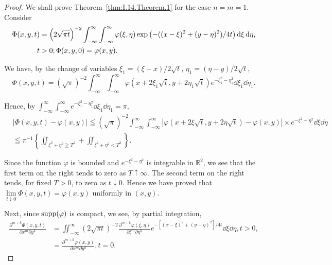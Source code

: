 \begin{proof}
 We shall prove Theorem~\ref{thm:I.14.Theorem.1} for the case $n = m = 1$. Consider 
\begin{align}
\Phi (x, y, t)& = \left(2 \sqrt {\pi t}\right) ^{-2} \int_{- \infty} ^{\infty} \int_{- \infty} ^{\infty} \varphi (\xi , \eta) \exp\left(- ((x- \xi) ^{2} + (y- \eta) ^{2}) / 4 t\right) \mathop{}\!\mathrm{d} \xi \mathop{}\!\mathrm{d} \eta , \notag \\
t& > 0; \Phi (x, y, 0) = \varphi (x, y).  \label{eq:I.14.2}
\end{align}

We have, by the change of variables $\xi_{1} = (\xi- x)/2\sqrt{t}$, $\eta_{1} = (\eta- y)/2\sqrt{t}$, 
\[
\Phi (x, y, t) = (\sqrt {\pi}) ^{-2} \int_{- \infty} ^{\infty} \int_{- \infty} ^{\infty} \varphi (x + 2 \xi_{1} \sqrt {t}, y + 2 \eta_{1} \sqrt {t}) e ^ {- \xi_{1} ^{2}- \eta_{1} ^{2}} \dd \xi_{1} \dd \eta_{1}.
\]

Hence, by $\int_{-\infty}^{\infty}\int_{-\infty}^{\infty}e^{-\xi_1^2-\eta_1^2}\dd\xi_1\dd\eta_1 = \pi ,$ 
\[
\begin{aligned}
&\left| \Phi (x, y, t)- \varphi (x, y) \right| \leqq \left(\sqrt {\pi}\right) ^{-2} \int_{- \infty} ^{\infty} \int_{- \infty} ^{\infty} \left| \varphi (x + 2 \xi \sqrt {t}, y + 2 \eta \sqrt {t})- \varphi (x, y) \right| \times e ^ {- \xi^{2}- \eta^{2}} \dd \xi \dd \eta
\\
&\leqq \pi^{-1} \left\{\iint_ {\xi^{2} + \eta^{2} \geqq T ^{2}} + \iint_ {\xi^{2} + \eta^{2} < T ^{2}} \right\}.
\end{aligned}
\]

Since the function $\varphi$ is bounded and $e^{-\xi^2- \eta^2}$ is integrable in $\mathbb{R}^{2}$, we see that the first term on the right tends to zero as $T \uparrow \infty$. The second term on the right tends, for fixed $T > 0$, to zero as $t \downarrow 0$. Hence we have proved that $\lim\limits_{t \downarrow 0} \Phi(x, y, t) = \varphi(x, y)$ uniformly in $(x, y)$. 


Next, since $\operatorname{supp}(\varphi)$ is compact, we see, by partial integration, 
\[
\begin{aligned} \frac {\partial^{m+k} \Phi (x , y , t)}{\partial x ^{m} \partial y ^{k}} & = \iint_{- \infty} ^{\infty} (2 \sqrt {\pi t}) ^{-2} \frac {\partial^{m+k} \varphi (\xi , \eta)}{\partial \xi^{m} \partial \eta^{k}} e ^ {- [ (x- \xi) ^{2} + (y- \eta) ^{2} ] / 4 t} \dd \xi \dd \eta , t > 0, \\ & = \frac {\partial^{m+k} \varphi (x , y)}{\partial x ^{m} \partial y ^{k}}, t = 0. \end{aligned}
\]


\end{proof}
